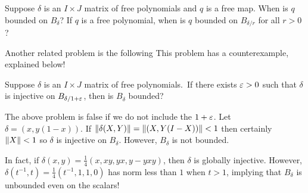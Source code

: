 \documentclass[oneside]{amsbook}
\numberwithin{equation}{section}
\begin{document}
\begin{problem}
	Suppose $\delta$ is an $I\times J$ matrix of free polynomials and $q$ is a free map.
	When is $q$ bounded on $B_\delta$? If $q$ is a free polynomial, when is $q$ bounded on $B_{\delta/r}$ for all $r>0$?
\end{problem}

Another related problem is the following {\color{red} This problem has a counterexample, explained below!}

\begin{problem}
	Suppose $\delta$ is an $I\times J$ matrix of free polynomials.\
	If there exists $\varepsilon>0$ such that $\delta$ is injective on $B_{\delta/1+\varepsilon}$, then is $B_\delta$ bounded?
\end{problem}

The above problem is false if we do not include the $1+\varepsilon$. Let $\delta = (x, y(1-x))$.
If ${\left\Vert\delta(X,Y)\right\Vert} = {\left\Vert(X,Y(I-X))\right\Vert}<1$ then certainly ${\left\Vert X\right\Vert}<1$ so $\delta$ is injective on $B_\delta$.
However, $B_\delta$ is not bounded.

In fact, if $\delta(x,y) = \frac{1}{4}(x, xy, yx, y - yxy)$, then $\delta$ is globally injective.
However, $\delta(t^{-1}, t) = \frac{1}{4}(t^{-1}, 1, 1, 0)$ has norm less than $1$ when $t>1$, implying that $B_\delta$ is unbounded even on 
the scalars!
\end{document}
